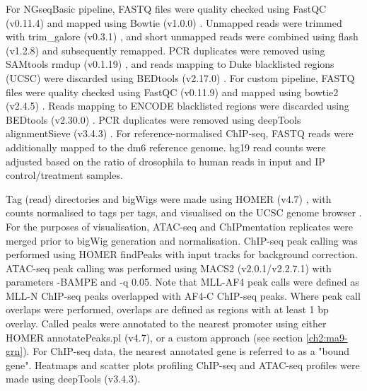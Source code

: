 For NGseqBasic pipeline, FASTQ files were quality checked using FastQC (v0.11.4) and mapped using Bowtie (v1.0.0) \citep{langmead_aligning_2010}. Unmapped reads were trimmed with trim\_galore (v0.3.1) \citep{martin_cutadapt_2011}, and short unmapped reads were combined using flash (v1.2.8) \citep{magoc_flash_2011} and subsequently remapped. PCR duplicates were removed using SAMtools rmdup (v0.1.19) \citep{li_sequence_2009}, and reads mapping to Duke blacklisted regions (UCSC) were discarded using BEDtools (v2.17.0) \citep{quinlan_bedtools_2010}. For custom pipeline, FASTQ files were quality checked using FastQC (v0.11.9) and mapped using bowtie2 (v2.4.5) \citep{langmead_fast_2012}. Reads mapping to ENCODE blacklisted regions \citep{amemiya_encode_2019} were discarded using BEDtools (v2.30.0) \citep{quinlan_bedtools_2010}. PCR duplicates were removed using deepTools alignmentSieve (v3.4.3) \citep{ramirez_deeptools2_2016}. For reference-normalised ChIP-seq, FASTQ reads were additionally mapped to the dm6 reference genome. hg19 read counts were adjusted based on the ratio of drosophila to human reads in input and IP control/treatment samples. 

Tag (read) directories and bigWigs were made using HOMER (v4.7) \citep{heinz_simple_2010}, with counts normalised to tags per  tags, and visualised on the UCSC genome browser \citep{kent_human_2002}. For the purposes of visualisation, ATAC-seq and ChIPmentation replicates were merged prior to bigWig generation and normalisation. ChIP-seq peak calling was performed using HOMER findPeaks with input tracks for background correction. ATAC-seq peak calling was performed using MACS2 (v2.0.1/v2.2.7.1) \citep{zhang_model-based_2008} with parameters -BAMPE and -q 0.05. Note that MLL-AF4 peak calls were defined as MLL-N ChIP-seq peaks overlapped with AF4-C ChIP-seq peaks. Where peak call overlaps were performed, overlaps are defined as regions with at least 1 bp overlay. Called peaks were annotated to the nearest promoter using either HOMER annotatePeaks.pl (v4.7), or a custom approach (see section \ref{ch2:ma9-grn}). For ChIP-seq data, the nearest annotated gene is referred to as a "bound gene". Heatmaps and scatter plots profiling ChIP-seq and ATAC-seq profiles were made using deepTools (v3.4.3). 

